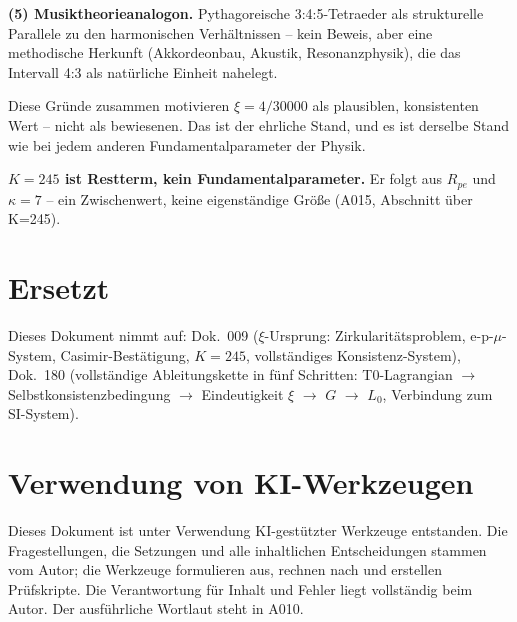 \textbf{(5) Musiktheorieanalogon.} Pythagoreische 3:4:5-Tetraeder als
strukturelle Parallele zu den harmonischen Verhältnissen -- kein Beweis,
aber eine methodische Herkunft (Akkordeonbau, Akustik, Resonanzphysik),
die das Intervall 4:3 als natürliche Einheit nahelegt.

Diese Gründe zusammen motivieren $\xi=4/30000$ als plausiblen, konsistenten
Wert -- nicht als bewiesenen. Das ist der ehrliche Stand, und es ist derselbe
Stand wie bei jedem anderen Fundamentalparameter der Physik.

\textbf{$K=245$ ist Restterm, kein Fundamentalparameter.} Er folgt aus $R_{pe}$
und $\kappa=7$ -- ein Zwischenwert, keine eigenständige Größe (A015, Abschnitt
über K=245).

\section{Ersetzt}

Dieses Dokument nimmt auf: Dok.~009 ($\xi$-Ursprung: Zirkularitätsproblem,
e-p-$\mu$-System, Casimir-Bestätigung, $K=245$, vollständiges Konsistenz-System),
Dok.~180 (vollständige Ableitungskette in fünf Schritten: T0-Lagrangian
$\to$ Selbstkonsistenzbedingung $\to$ Eindeutigkeit $\xi$ $\to$ $G$ $\to$ $L_0$,
Verbindung zum SI-System).

\section{Verwendung von KI-Werkzeugen}

Dieses Dokument ist unter Verwendung KI-gestützter Werkzeuge entstanden. Die
Fragestellungen, die Setzungen und alle inhaltlichen Entscheidungen stammen vom
Autor; die Werkzeuge formulieren aus, rechnen nach und erstellen Prüfskripte.
Die Verantwortung für Inhalt und Fehler liegt vollständig beim Autor. Der
ausführliche Wortlaut steht in A010.
